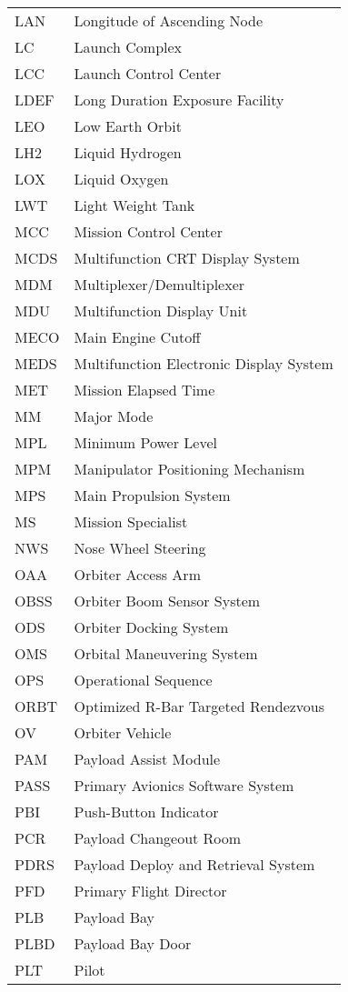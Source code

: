 \documentclass[Space_Shuttle_Vessel_Manual.tex]{subfiles}
\begin{document}
\begin{longtable}{l l }
LAN & Longitude of Ascending Node\\
LC & Launch Complex\\
LCC & Launch Control Center\\
LDEF & Long Duration Exposure Facility\\
LEO & Low Earth Orbit\\
LH2 & Liquid Hydrogen\\
LOX & Liquid Oxygen\\
LWT & Light Weight Tank\\
MCC & Mission Control Center\\
MCDS & Multifunction CRT Display System\\
MDM & Multiplexer/Demultiplexer\\
MDU & Multifunction Display Unit\\
MECO & Main Engine Cutoff\\
MEDS & Multifunction Electronic Display System\\
MET & Mission Elapsed Time\\
MM & Major Mode\\
MPL & Minimum Power Level\\
MPM & Manipulator Positioning Mechanism\\
MPS & Main Propulsion System\\
MS & Mission Specialist\\
NWS & Nose Wheel Steering\\
OAA & Orbiter Access Arm\\
OBSS & Orbiter Boom Sensor System\\
ODS & Orbiter Docking System\\
OMS & Orbital Maneuvering System\\
OPS & Operational Sequence\\
ORBT & Optimized R-Bar Targeted Rendezvous\\
OV & Orbiter Vehicle\\
PAM & Payload Assist Module\\
PASS & Primary Avionics Software System\\
PBI & Push-Button Indicator\\
PCR & Payload Changeout Room\\
PDRS & Payload Deploy and Retrieval System\\
PFD & Primary Flight Director\\
PLB & Payload Bay\\
PLBD & Payload Bay Door\\
PLT & Pilot\\

\end{longtable}
\end{document}
